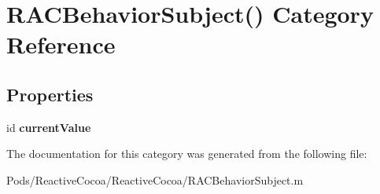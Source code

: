 \hypertarget{category_r_a_c_behavior_subject_07_08}{}\section{R\+A\+C\+Behavior\+Subject() Category Reference}
\label{category_r_a_c_behavior_subject_07_08}
\subsection*{Properties}
\begin{DoxyCompactItemize}
\item 
\mbox{\label{category_r_a_c_behavior_subject_07_08_a6a2bd5dd69ed132135e4a847fe27daf1}} 
id {\bfseries current\+Value}
\end{DoxyCompactItemize}


The documentation for this category was generated from the following file\+:\begin{DoxyCompactItemize}
\item 
Pods/\+Reactive\+Cocoa/\+Reactive\+Cocoa/R\+A\+C\+Behavior\+Subject.\+m\end{DoxyCompactItemize}
